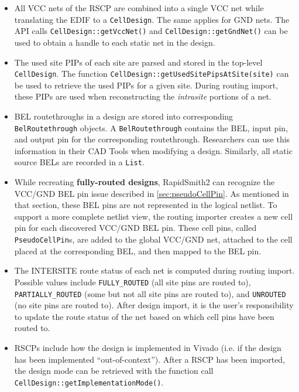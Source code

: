 \begin{itemize}
  \item All VCC nets of the RSCP are combined into a single VCC net while
  translating the EDIF to a \texttt{Cell\-Design}. The same applies for GND
  nets.
  The API calls \texttt{CellDesign::get\-VccNet()} and
  \texttt{CellDesign::get\-GndNet()} can be used to obtain a handle to each
  static net in the design.
  
  \item The used site PIPs of each site are parsed and stored in the top-level
  \texttt{Cell\-Design}. The function
  \texttt{CellDes\-ign::getUsedSitePipsAtSite(site)} can be used to retrieve the
  used PIPs for a given site. During routing import, these PIPs are used when
  reconstructing the \textit{intrasite} portions of a net.
  
  \item BEL routethroughs in a design are stored into corresponding
  \texttt{BelRoutethrough} objects. A \texttt{BelRouteth\-rough} contains the
  BEL, input pin, and output pin for the corresponding routethrough. Researchers
  can use this information in their CAD Tools when modifying a design.
  Similarly, all static source BELs are recorded in a \texttt{List}.
  
  \item While recreating \textbf{fully-routed designs}, RapidSmith2 can
  recognize the VCC/GND BEL pin issue described in \autoref{sec:pseudoCellPin}.
  As mentioned in that section, these BEL pins are not represented in the
  logical netlist. To support a more complete netlist view, the
  routing importer creates a new cell pin for each discovered VCC/GND BEL
  pin. These cell pins, called \texttt{PseudoCellPin}s, are added
  to the global VCC/GND net, attached to the cell placed at the
  corresponding BEL, and then mapped to the BEL pin.
  
  \item The INTERSITE route status of each net is computed during routing
  import. Possible values include \texttt{FULLY\_RO\-UTED} (all site pins are
  routed to), \texttt{PARTIALLY\_ROU\-TED} (some but not all site pins are
  routed to), and \texttt{UNROU\-TED} (no site pins are routed to). After design
  import, it is the user's responsibility to update the route status of the net
  based on which cell pins have been routed to.
  
  \item RSCPs include how the design is implemented in Vivado (i.e. if the
  design has been implemented ``out-of-context''). After a RSCP has been
  imported, the design mode can be retrieved with the function call
  \texttt{CellDe\-sign::getImplementationMode()}.
  
\end{itemize}

